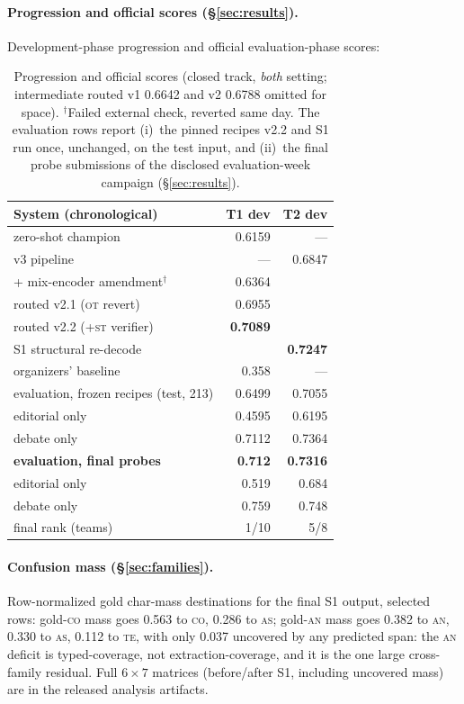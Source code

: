 \documentclass[11pt]{article}
\newcommand{\lab}[1]{\textsc{#1}}
\newcommand{\co}{\lab{co}}
\newcommand{\as}{\lab{as}}
\newcommand{\te}{\lab{te}}
\newcommand{\st}{\lab{st}}
\newcommand{\an}{\lab{an}}
\newcommand{\ot}{\lab{ot}}
\begin{document}
\paragraph{Progression and official scores (\S\ref{sec:results}).}
Development-phase progression and official evaluation-phase scores:

\begin{table}[h]
\centering\scriptsize
\begin{tabular}{lrr}
\toprule
System (chronological) & T1 dev & T2 dev \\
\midrule
zero-shot champion & 0.6159 & --- \\
v3 pipeline & --- & 0.6847 \\
\quad + mix-encoder amendment$^\dagger$ & 0.6364 & \\
routed v2.1 (\ot{} revert) & 0.6955 & \\
routed v2.2 ({+}\st{} verifier) & \textbf{0.7089} & \\
S1 structural re-decode & & \textbf{0.7247} \\
\midrule
organizers' baseline & 0.358 & --- \\
\midrule
evaluation, frozen recipes (test, 213) & 0.6499 & 0.7055 \\
\quad editorial only & 0.4595 & 0.6195 \\
\quad debate only & 0.7112 & 0.7364 \\
\textbf{evaluation, final probes} & \textbf{0.712} & \textbf{0.7316} \\
\quad editorial only & 0.519 & 0.684 \\
\quad debate only & 0.759 & 0.748 \\
\quad final rank (teams) & 1/10 & 5/8 \\
\bottomrule
\end{tabular}
\caption{Progression and official scores (closed track, \emph{both}
setting; intermediate routed v1 0.6642 and v2 0.6788 omitted for space).
$^\dagger$Failed external check, reverted same day. The evaluation rows
report (i)~the pinned recipes v2.2 and S1 run once, unchanged, on the
test input, and (ii)~the final probe submissions of the disclosed
evaluation-week campaign (\S\ref{sec:results}).}
\label{tab:progression}
\end{table}

\paragraph{Confusion mass (\S\ref{sec:families}).} Row-normalized gold
char-mass destinations for the final S1 output, selected rows: gold-\co{}
mass goes 0.563 to \co, 0.286 to \as; gold-\an{} mass goes 0.382 to \an,
0.330 to \as, 0.112 to \te, with only 0.037 uncovered by any predicted
span: the \an{} deficit is typed-coverage, not extraction-coverage, and
it is the one large cross-family residual. Full $6{\times}7$ matrices
(before/after S1, including uncovered mass) are in the released analysis
artifacts.
\end{document}
